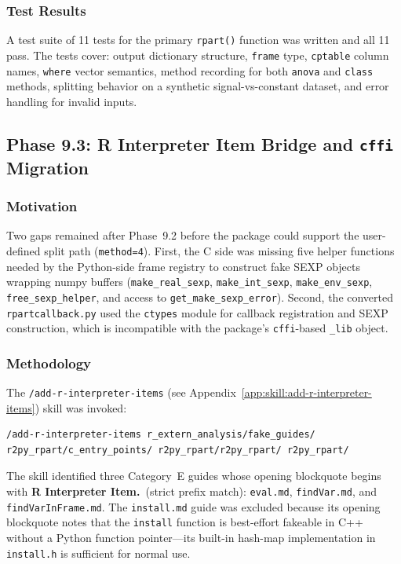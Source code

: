 \documentclass[12pt]{article}
\newcommand{\skillapp}[2]{\texttt{/#1} (see Appendix~\ref{app:skill:#2})}
\begin{document}
\subsubsection{Test Results}

A test suite of 11 tests for the primary \texttt{rpart()} function was written and all 11 pass. The tests cover: output dictionary structure, \texttt{frame} type, \texttt{cptable} column names, \texttt{where} vector semantics, method recording for both \texttt{anova} and \texttt{class} methods, splitting behavior on a synthetic signal-vs-constant dataset, and error handling for invalid inputs.

\subsection{Phase 9.3: R Interpreter Item Bridge and \texttt{cffi} Migration}
\label{sec:phase9.3}

\subsubsection{Motivation}

Two gaps remained after Phase~9.2 before the package could support the user-defined split path (\texttt{method=4}). First, the C side was missing five helper functions needed by the Python-side frame registry to construct fake SEXP objects wrapping numpy buffers (\texttt{make\_real\_sexp}, \texttt{make\_int\_sexp}, \texttt{make\_env\_sexp}, \texttt{free\_sexp\_helper}, and access to \texttt{get\_make\_sexp\_error}). Second, the converted \texttt{rpartcallback.py} used the \texttt{ctypes} module for callback registration and SEXP construction, which is incompatible with the package's \texttt{cffi}-based \texttt{\_lib} object.

\subsubsection{Methodology}

The \skillapp{add-r-interpreter-items}{add-r-interpreter-items} skill was invoked:
\begin{lstlisting}[style=skill]
/add-r-interpreter-items r_extern_analysis/fake_guides/ r2py_rpart/c_entry_points/ r2py_rpart/r2py_rpart/ r2py_rpart/
\end{lstlisting}

The skill identified three Category~E guides whose opening blockquote begins with \textbf{R Interpreter Item.}\ (strict prefix match): \texttt{eval.md}, \texttt{findVar.md}, and \texttt{findVarInFrame.md}. The \texttt{install.md} guide was excluded because its opening blockquote notes that the \texttt{install} function is best-effort fakeable in C++ without a Python function pointer---its built-in hash-map implementation in \texttt{install.h} is sufficient for normal use.
\end{document}
